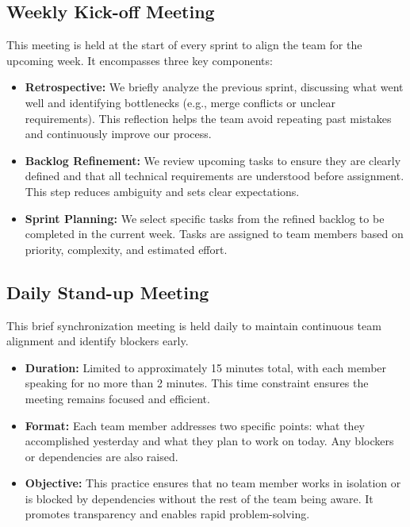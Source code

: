 \subsection{Weekly Kick-off Meeting}
This meeting is held at the start of every sprint to align the team for the upcoming week. It encompasses three key components:
\begin{itemize}
    \item \textbf{Retrospective:} We briefly analyze the previous sprint, discussing what went well and identifying bottlenecks (e.g., merge conflicts or unclear requirements). This reflection helps the team avoid repeating past mistakes and continuously improve our process.
    \item \textbf{Backlog Refinement:} We review upcoming tasks to ensure they are clearly defined and that all technical requirements are understood before assignment. This step reduces ambiguity and sets clear expectations.
    \item \textbf{Sprint Planning:} We select specific tasks from the refined backlog to be completed in the current week. Tasks are assigned to team members based on priority, complexity, and estimated effort.
\end{itemize}

\subsection{Daily Stand-up Meeting}
This brief synchronization meeting is held daily to maintain continuous team alignment and identify blockers early.
\begin{itemize}
    \item \textbf{Duration:} Limited to approximately 15 minutes total, with each member speaking for no more than 2 minutes. This time constraint ensures the meeting remains focused and efficient.
    \item \textbf{Format:} Each team member addresses two specific points: what they accomplished yesterday and what they plan to work on today. Any blockers or dependencies are also raised.
    \item \textbf{Objective:} This practice ensures that no team member works in isolation or is blocked by dependencies without the rest of the team being aware. It promotes transparency and enables rapid problem-solving.
\end{itemize}

